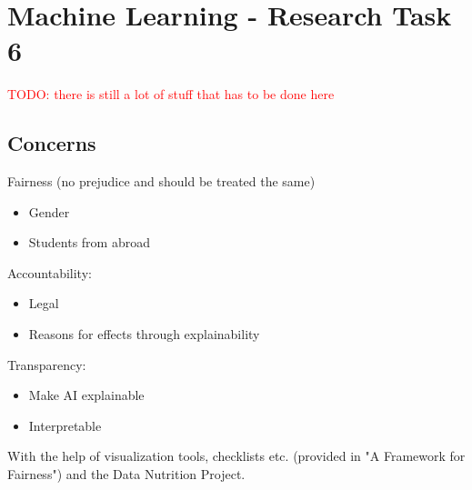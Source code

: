 \section{Machine Learning - Research Task 6}\label{sec:ai}
\textcolor{red}{TODO: there is still a lot of stuff that has to be done here}

\subsection{Concerns}
Fairness (no prejudice and should be treated the same)
\begin{itemize}
    \item Gender
    \item Students from abroad
\end{itemize}

Accountability:
\begin{itemize}
    \item Legal
    \item Reasons for effects through explainability
\end{itemize}

Transparency:
\begin{itemize}
    \item Make AI explainable
    \item Interpretable
\end{itemize}


With the help of visualization tools, checklists etc. (provided in "A Framework for Fairness") and the Data Nutrition Project.

